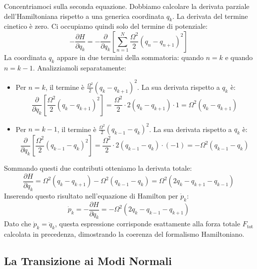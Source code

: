 Concentriamoci sulla seconda equazione. Dobbiamo calcolare la derivata parziale dell'Hamiltoniana rispetto a una generica coordinata $q_k$. La derivata del termine cinetico è zero. Ci occupiamo quindi solo del termine di potenziale:
\begin{equation}
    -\frac{\partial H}{\partial q_k} = -\frac{\partial}{\partial q_k} \left[ \sum_{n=1}^{N} \frac{\Omega^2}{2}(q_n - q_{n+1})^2 \right]
\end{equation}
La coordinata $q_k$ appare in due termini della sommatoria: quando $n=k$ e quando $n=k-1$. Analizziamoli separatamente:
\begin{itemize}
    \item Per $n=k$, il termine è $\frac{\Omega^2}{2}(q_k - q_{k+1})^2$. La sua derivata rispetto a $q_k$ è:
    \begin{equation*}
        \frac{\partial}{\partial q_k} \left[ \frac{\Omega^2}{2}(q_k - q_{k+1})^2 \right] = \frac{\Omega^2}{2} \cdot 2(q_k - q_{k+1}) \cdot 1 = \Omega^2(q_k - q_{k+1})
    \end{equation*}
    \item Per $n=k-1$, il termine è $\frac{\Omega^2}{2}(q_{k-1} - q_k)^2$. La sua derivata rispetto a $q_k$ è:
    \begin{equation*}
        \frac{\partial}{\partial q_k} \left[ \frac{\Omega^2}{2}(q_{k-1} - q_k)^2 \right] = \frac{\Omega^2}{2} \cdot 2(q_{k-1} - q_k) \cdot (-1) = -\Omega^2(q_{k-1} - q_k)
    \end{equation*}
\end{itemize}
Sommando questi due contributi otteniamo la derivata totale:
\begin{equation}
    \frac{\partial H}{\partial q_k} = \Omega^2(q_k - q_{k+1}) - \Omega^2(q_{k-1} - q_k) = \Omega^2(2q_k - q_{k+1} - q_{k-1})
\end{equation}
Inserendo questo risultato nell'equazione di Hamilton per $\dot{p}_k$:
\begin{equation}
    \dot{p}_k = -\frac{\partial H}{\partial q_k} = -\Omega^2(2q_k - q_{k-1} - q_{k+1})
\end{equation}
Dato che $\dot{p}_k = \ddot{q}_k$, questa espressione corrisponde esattamente alla forza totale $F_{\text{tot}}$ calcolata in precedenza, dimostrando la coerenza del formalismo Hamiltoniano.







\subsection{La Transizione ai Modi Normali}

